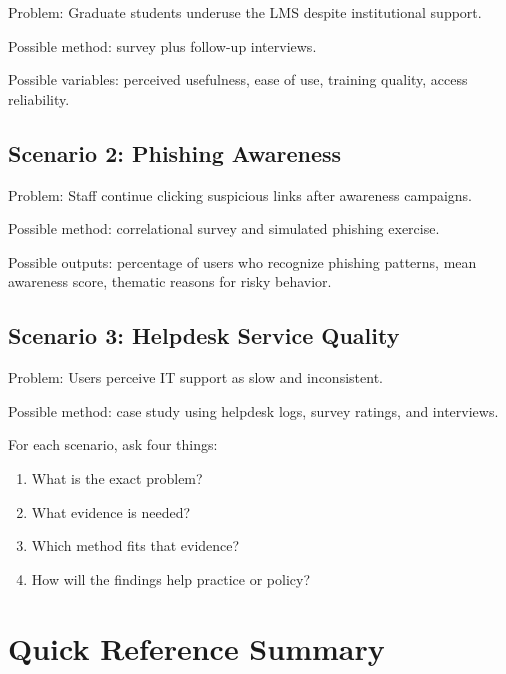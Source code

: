 \documentclass[11pt,a4paper]{article}
\begin{document}
Problem: Graduate students underuse the LMS despite institutional support.

Possible method: survey plus follow-up interviews.

Possible variables: perceived usefulness, ease of use, training quality, access reliability.

\subsection{Scenario 2: Phishing Awareness}

Problem: Staff continue clicking suspicious links after awareness campaigns.

Possible method: correlational survey and simulated phishing exercise.

Possible outputs: percentage of users who recognize phishing patterns, mean awareness score, thematic reasons for risky behavior.

\subsection{Scenario 3: Helpdesk Service Quality}

Problem: Users perceive IT support as slow and inconsistent.

Possible method: case study using helpdesk logs, survey ratings, and interviews.

\begin{examplebox}
For each scenario, ask four things:
\begin{enumerate}[leftmargin=*]
  \item What is the exact problem?
  \item What evidence is needed?
  \item Which method fits that evidence?
  \item How will the findings help practice or policy? 
\end{enumerate}
\end{examplebox}

\section{Quick Reference Summary}
\end{document}
